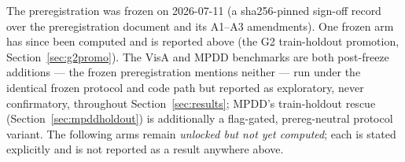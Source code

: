 \documentclass[11pt]{article}
\begin{document}
The preregistration was frozen on 2026-07-11 (a sha256-pinned sign-off record over the
preregistration document and its A1--A3 amendments). One frozen arm
has since been computed and is reported above (the G2 train-holdout promotion,
Section~\ref{sec:g2promo}). The VisA and MPDD benchmarks are both post-freeze additions ---
the frozen preregistration mentions neither --- run under the identical frozen protocol and
code path but reported as exploratory, never confirmatory, throughout
Section~\ref{sec:results}; MPDD's train-holdout rescue (Section~\ref{sec:mpddholdout}) is
additionally a flag-gated, prereg-neutral protocol variant. The following arms remain
\emph{unlocked but not yet computed}; each is
stated explicitly and is not reported as a result anywhere above.
\end{document}
